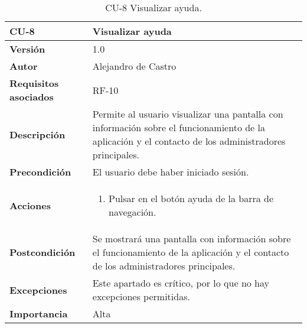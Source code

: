 \begin{table}[p]
	\centering
	\begin{tabularx}{\linewidth}{ p{} p{} }
		\toprule
		\textbf{CU-8}    & \textbf{Visualizar ayuda}\\
		\toprule
		\textbf{Versión}              & 1.0    \\
		\textbf{Autor}                & {Alejandro de Castro} \\
		\textbf{Requisitos asociados} & RF-10 \\
		\textbf{Descripción}          & Permite al usuario visualizar una pantalla con información sobre el funcionamiento de la aplicación y el contacto de los administradores principales. \\
		\textbf{Precondición}         & El usuario debe haber iniciado sesión. \\
        \textbf{Acciones}             &
		\begin{enumerate}
			\def\labelenumi{\arabic{enumi}.}
			\tightlist
			\item Pulsar en el botón ayuda de la barra de navegación.
		\end{enumerate}\\ 
		\textbf{Postcondición}        & Se mostrará una pantalla con información sobre el funcionamiento de la aplicación y el contacto de los administradores principales. \\
		\textbf{Excepciones}          & Este apartado es crítico, por lo que no hay excepciones permitidas. \\
		\textbf{Importancia}          & Alta \\
		\bottomrule
	\end{tabularx}
	\caption{CU-8 Visualizar ayuda.}
\end{table}